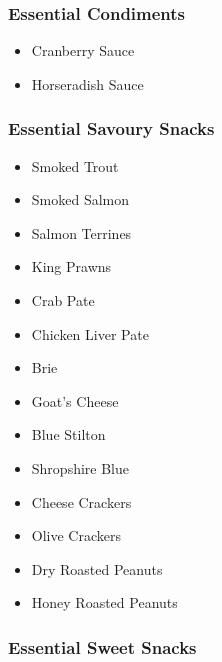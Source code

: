 \documentclass[11pt, english]{article}
\begin{document}
		\subsubsection*{Essential Condiments}

	\begin{itemize}
	\setlength\itemsep{0cm}
		\item Cranberry Sauce
		\item Horseradish Sauce
	\end{itemize}

		\subsubsection*{Essential Savoury Snacks}

	\begin{itemize}
	\setlength\itemsep{0cm}
		\item Smoked Trout
		\item Smoked Salmon
		\item Salmon Terrines
		\item King Prawns
		\item Crab Pate
		\item Chicken Liver Pate
		\item Brie
		\item Goat's Cheese
		\item Blue Stilton
		\item Shropshire Blue
		\item Cheese Crackers
		\item Olive Crackers
		\item Dry Roasted Peanuts
		\item Honey Roasted Peanuts
	\end{itemize}

		\subsubsection*{Essential Sweet Snacks}
\end{document}
